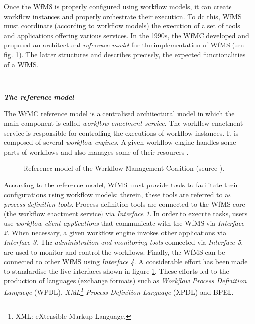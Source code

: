 Once the WfMS is properly configured using workflow models, it can create workflow instances and properly orchestrate their execution. To do this, WfMS must coordinate (according to workflow models) the execution of a set of tools and applications offering various services. In the 1990s, the WfMC developed and proposed an architectural \textit{reference model} for the implementation of WfMS \cite{workflowModel} (see fig. \ref{chap1:fig:wfms-reference-model}). The latter structures and describes precisely, the expected functionalities of a WfMS.

~

\noindent\textbf{\textit{The reference model}}

The WfMC reference model is a centralised architectural model in which the main component is called \textit{workflow enactment service}. The workflow enactment service is responsible for controlling the executions of workflow instances. It is composed of several \textit{workflow engines}. A given workflow engine handles some parts of workflows and also manages some of their resources \cite{van2013business, dumas2018fundamental}. 
\begin{figure}[ht!]
	\noindent
	\caption{Reference model of the Workflow Management Coalition (source \cite{workflowModel}).}
	\label{chap1:fig:wfms-reference-model}
\end{figure}
According to the reference model, WfMS must provide tools to facilitate their configurations using workflow models: therein, these tools are referred to as \textit{process definition tools}. Process definition tools are connected to the WfMS core (the workflow enactment service) via \textit{Interface 1}. In order to execute tasks, users use \textit{workflow client applications} that communicate with the WfMS via \textit{Interface 2}. When necessary, a given workflow engine invokes other applications via \textit{Interface 3}. The \textit{administration and monitoring tools} connected via \textit{Interface 5}, are used to monitor and control the workflows. Finally, the WfMS can be connected to other WfMS using \textit{Interface 4}. A considerable effort has been made to standardise the five interfaces shown in figure \ref{chap1:fig:wfms-reference-model}. These efforts led to the production of languages (exchange formats) such as \textit{Workflow Process Definition Language} (WPDL), \textit{XML\footnote{XML: eXtensible Markup Language.} Process Definition Language} (XPDL) and BPEL.

